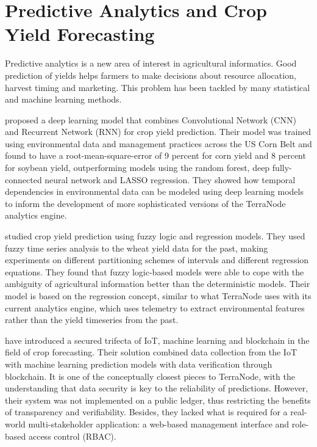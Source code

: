 \section{Predictive Analytics and Crop Yield Forecasting}

Predictive analytics is a new area of interest in agricultural informatics. Good prediction of yields helps farmers to make decisions about resource allocation, harvest timing and marketing. This problem has been tackled by many statistical and machine learning methods.

\textcite{khaki2019cnn} proposed a deep learning model that combines Convolutional Network (CNN) and Recurrent Network (RNN) for crop yield prediction. Their model was trained using environmental data and management practices across the US Corn Belt and found to have a root-mean-square-error of 9 percent for corn yield and 8 percent for soybean yield, outperforming models using the random forest, deep fully-connected neural network and LASSO regression. They showed how temporal dependencies in environmental data can be modeled using deep learning models to inform the development of more sophisticated versions of the TerraNode analytics engine.

\textcite{garg2018crop} studied crop yield prediction using fuzzy logic and regression models. They used fuzzy time series analysis to the wheat yield data for the past, making experiments on different partitioning schemes of intervals and different regression equations. They found that fuzzy logic-based models were able to cope with the ambiguity of agricultural information better than the deterministic models. Their model is based on the regression concept, similar to what TerraNode uses with its current analytics engine, which uses telemetry to extract environmental features rather than the yield timeseries from the past.

\textcite{layek2025secured} have introduced a secured trifecta of IoT, machine learning and blockchain in the field of crop forecasting. Their solution combined data collection from the IoT with machine learning prediction models with data verification through blockchain. It is one of the conceptually closest pieces to TerraNode, with the understanding that data security is key to the reliability of predictions. However, their system was not implemented on a public ledger, thus restricting the benefits of transparency and verifiability. Besides, they lacked what is required for a real-world multi-stakeholder application: a web-based management interface and role-based access control (RBAC).

